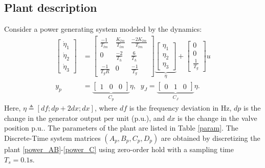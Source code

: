 \subsection{Plant description}
Consider a power generating system \citep[Sec.4]{park2019stealthy} %
modeled by the dynamics:
\begin{align}
\label{power_AB} \begin{bmatrix}
\dot{\eta}_1\\ \dot{\eta}_2 \\ \dot{\eta}_3
\end{bmatrix} &= 
\begin{bmatrix}
\frac{-1}{T_{lm}} & \frac{K_{lm}}{T_{lm}} & \frac{-2K_{lm}}{T_{lm}}\\
0 & \frac{-2}{T_h} & \frac{6}{T_h}\\
\frac{-1}{T_g R} & 0 & \frac{-1}{T_g}
\end{bmatrix}
\underbrace{\begin{bmatrix}
{\eta}_1\\ {\eta}_2 \\ {\eta}_3
\end{bmatrix}}_{\eta}
+ \begin{bmatrix}
0\\ 0 \\ \frac{1}{T_g}
\end{bmatrix}
{u}\\
\label{power_C} y_p &= \underbrace{ \begin{bmatrix}
1 & 0 & 0 
\end{bmatrix}}_{C_p}\eta,\;\;
y_J = \underbrace{
\begin{bmatrix}
0 & 1 & 0
\end{bmatrix}}_{C_J}\eta.
\end{align}
Here, $\eta \triangleq [df; dp + 2 dx; dx]$, where $df$ is the frequency deviation in \mbox{Hz}, $dp$ is the change in the generator output per unit (\mbox{p.u.}), and $dx$ is the change in the valve position \mbox{p.u.}. The parameters of the plant are listed in Table \ref{param}. 
The Discrete-Time system matrices $(A_p,B_p,C_p,D_p)$ are obtained by discretizing the plant \eqref{power_AB}-\eqref{power_C} using zero-order hold with a sampling time $T_s=0.1\mbox{s}$. 

